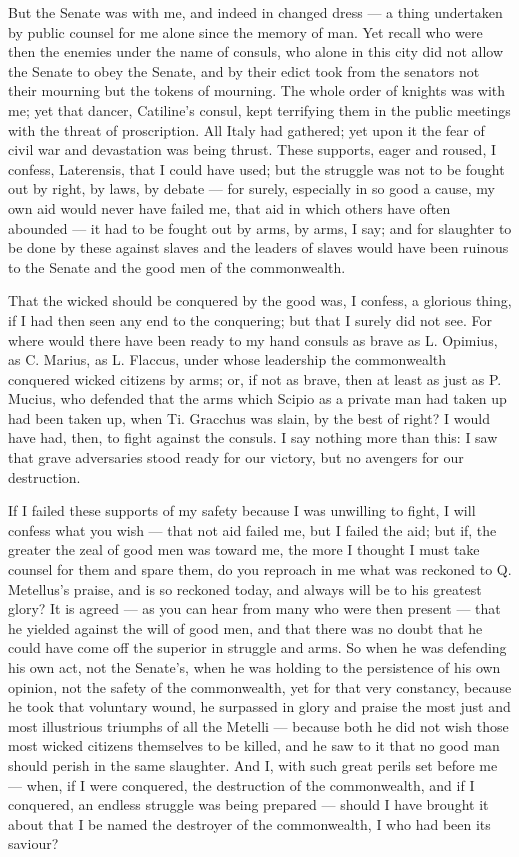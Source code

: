  But the Senate was with me, and indeed in changed dress --- a thing undertaken by public counsel for me alone since the memory of man. Yet recall who were then the enemies under the name of consuls, who alone in this city did not allow the Senate to obey the Senate, and by their edict took from the senators not their mourning but the tokens of mourning. The whole order of knights was with me; yet that dancer, Catiline's consul, kept terrifying them in the public meetings with the threat of proscription. All Italy had gathered; yet upon it the fear of civil war and devastation was being thrust. These supports, eager and roused, I confess, Laterensis, that I could have used; but the struggle was not to be fought out by right, by laws, by debate --- for surely, especially in so good a cause, my own aid would never have failed me, that aid in which others have often abounded --- it had to be fought out by arms, by arms, I say; and for slaughter to be done by these against slaves and the leaders of slaves would have been ruinous to the Senate and the good men of the commonwealth.

 That the wicked should be conquered by the good was, I confess, a glorious thing, if I had then seen any end to the conquering; but that I surely did not see. For where would there have been ready to my hand consuls as brave as L. Opimius, as C. Marius, as L. Flaccus, under whose leadership the commonwealth conquered wicked citizens by arms; or, if not as brave, then at least as just as P. Mucius, who defended that the arms which Scipio as a private man had taken up had been taken up, when Ti. Gracchus was slain, by the best of right? I would have had, then, to fight against the consuls. I say nothing more than this: I saw that grave adversaries stood ready for our victory, but no avengers for our destruction.

 If I failed these supports of my safety because I was unwilling to fight, I will confess what you wish --- that not aid failed me, but I failed the aid; but if, the greater the zeal of good men was toward me, the more I thought I must take counsel for them and spare them, do you reproach in me what was reckoned to Q. Metellus's praise, and is so reckoned today, and always will be to his greatest glory? It is agreed --- as you can hear from many who were then present --- that he yielded against the will of good men, and that there was no doubt that he could have come off the superior in struggle and arms. So when he was defending his own act, not the Senate's, when he was holding to the persistence of his own opinion, not the safety of the commonwealth, yet for that very constancy, because he took that voluntary wound, he surpassed in glory and praise the most just and most illustrious triumphs of all the Metelli --- because both he did not wish those most wicked citizens themselves to be killed, and he saw to it that no good man should perish in the same slaughter. And I, with such great perils set before me --- when, if I were conquered, the destruction of the commonwealth, and if I conquered, an endless struggle was being prepared --- should I have brought it about that I be named the destroyer of the commonwealth, I who had been its saviour?

